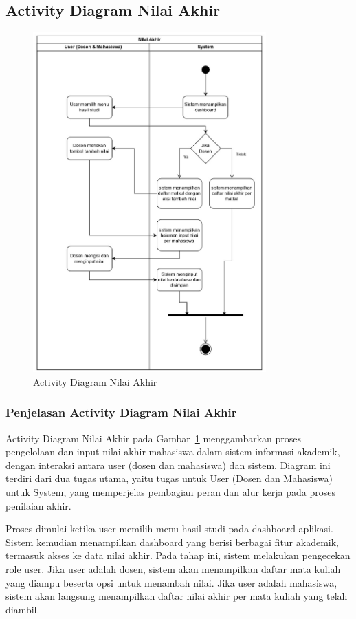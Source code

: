 \documentclass[a4paper,oneside,11pt]{book}
\begin{document}
\subsection{Activity Diagram Nilai Akhir}
\begin{figure}[H]
  \centering
  \includegraphics[width=0.8\textwidth]{Activity Diagram/Nilai Akhir.jpg}
  \caption{Activity Diagram Nilai Akhir}
  \label{fig:activity_nilai_akhir}
\end{figure}
\subsubsection{Penjelasan Activity Diagram Nilai Akhir}
Activity Diagram Nilai Akhir pada Gambar~\ref{fig:activity_nilai_akhir} menggambarkan proses pengelolaan dan input nilai akhir mahasiswa dalam sistem informasi akademik, dengan interaksi antara user (dosen dan mahasiswa) dan sistem. Diagram ini terdiri dari dua tugas utama, yaitu tugas untuk User (Dosen dan Mahasiswa) untuk System, yang memperjelas pembagian peran dan alur kerja pada proses penilaian akhir.

Proses dimulai ketika user memilih menu hasil studi pada dashboard aplikasi. Sistem kemudian menampilkan dashboard yang berisi berbagai fitur akademik, termasuk akses ke data nilai akhir. Pada tahap ini, sistem melakukan pengecekan role user. Jika user adalah dosen, sistem akan menampilkan daftar mata kuliah yang diampu beserta opsi untuk menambah nilai. Jika user adalah mahasiswa, sistem akan langsung menampilkan daftar nilai akhir per mata kuliah yang telah diambil.
\end{document}
